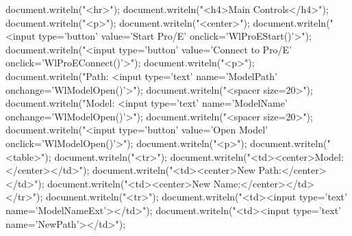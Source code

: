 \documentclass[]{article}
\newenvironment{Shaded}{}{}
\newcommand{\StringTok}[1]{\textcolor[rgb]{0.25,0.44,0.63}{{#1}}}
\newcommand{\OtherTok}[1]{\textcolor[rgb]{0.00,0.44,0.13}{{#1}}}
\newcommand{\FunctionTok}[1]{\textcolor[rgb]{0.02,0.16,0.49}{{#1}}}
\newcommand{\NormalTok}[1]{{#1}}
\begin{document}
\begin{Shaded}
\begin{Highlighting}[]
\OtherTok{document}\NormalTok{.}\FunctionTok{writeln}\NormalTok{(}\StringTok{"<hr>"}\NormalTok{);}
\OtherTok{document}\NormalTok{.}\FunctionTok{writeln}\NormalTok{(}\StringTok{"<h4>Main Controls</h4>"}\NormalTok{);}
\OtherTok{document}\NormalTok{.}\FunctionTok{writeln}\NormalTok{(}\StringTok{"<p>"}\NormalTok{);}
\OtherTok{document}\NormalTok{.}\FunctionTok{writeln}\NormalTok{(}\StringTok{"<center>"}\NormalTok{);}
\OtherTok{document}\NormalTok{.}\FunctionTok{writeln}\NormalTok{(}\StringTok{"<input type='button' value='Start Pro/E' onclick='WlProEStart()'>"}\NormalTok{);}
\OtherTok{document}\NormalTok{.}\FunctionTok{writeln}\NormalTok{(}\StringTok{"<input type='button' value='Connect to Pro/E' onclick='WlProEConnect()'>"}\NormalTok{);}
\OtherTok{document}\NormalTok{.}\FunctionTok{writeln}\NormalTok{(}\StringTok{"<p>"}\NormalTok{);}
\OtherTok{document}\NormalTok{.}\FunctionTok{writeln}\NormalTok{(}\StringTok{"Path: <input type='text' name='ModelPath' onchange='WlModelOpen()'>"}\NormalTok{);}
\OtherTok{document}\NormalTok{.}\FunctionTok{writeln}\NormalTok{(}\StringTok{"<spacer size=20>"}\NormalTok{);}
\OtherTok{document}\NormalTok{.}\FunctionTok{writeln}\NormalTok{(}\StringTok{"Model: <input type='text' name='ModelName' onchange='WlModelOpen()'>"}\NormalTok{);}
\OtherTok{document}\NormalTok{.}\FunctionTok{writeln}\NormalTok{(}\StringTok{"<spacer size=20>"}\NormalTok{);}
\OtherTok{document}\NormalTok{.}\FunctionTok{writeln}\NormalTok{(}\StringTok{"<input type='button' value='Open Model' onclick='WlModelOpen()'>"}\NormalTok{);}
\OtherTok{document}\NormalTok{.}\FunctionTok{writeln}\NormalTok{(}\StringTok{"<p>"}\NormalTok{);}
\OtherTok{document}\NormalTok{.}\FunctionTok{writeln}\NormalTok{(}\StringTok{"<table>"}\NormalTok{);}
\OtherTok{document}\NormalTok{.}\FunctionTok{writeln}\NormalTok{(}\StringTok{"<tr>"}\NormalTok{);}
\OtherTok{document}\NormalTok{.}\FunctionTok{writeln}\NormalTok{(}\StringTok{"<td><center>Model:</center></td>"}\NormalTok{);}
\OtherTok{document}\NormalTok{.}\FunctionTok{writeln}\NormalTok{(}\StringTok{"<td><center>New Path:</center></td>"}\NormalTok{);}
\OtherTok{document}\NormalTok{.}\FunctionTok{writeln}\NormalTok{(}\StringTok{"<td><center>New Name:</center></td></tr>"}\NormalTok{);}
\OtherTok{document}\NormalTok{.}\FunctionTok{writeln}\NormalTok{(}\StringTok{"<tr>"}\NormalTok{);}
\OtherTok{document}\NormalTok{.}\FunctionTok{writeln}\NormalTok{(}\StringTok{"<td><input type='text' name='ModelNameExt'></td>"}\NormalTok{);}
\OtherTok{document}\NormalTok{.}\FunctionTok{writeln}\NormalTok{(}\StringTok{"<td><input type='text' name='NewPath'></td>"}\NormalTok{);}

\end{Highlighting}
\end{Shaded}
\end{document}

